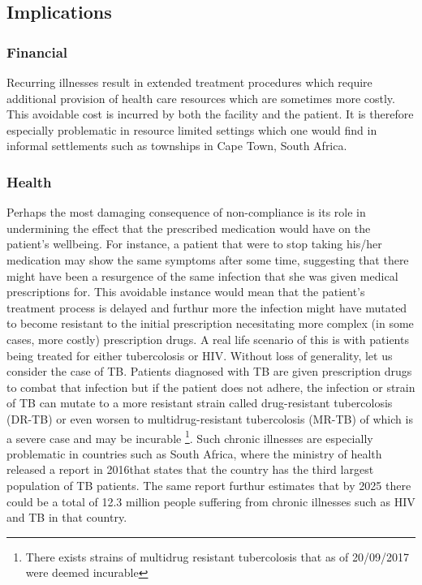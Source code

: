 \subsection{Implications}
\subsubsection{Financial}
Recurring illnesses result in extended treatment procedures which require additional provision of health care resources which are sometimes more costly\cite{SAGov16, Vern01}. This avoidable cost is incurred by both the facility and the patient. It is therefore especially problematic in resource limited settings which one would find in informal settlements such as townships in Cape Town, South Africa.

 \subsubsection{Health}

 Perhaps the most damaging consequence of non-compliance is its role in undermining the effect that the prescribed medication would have on the patient's wellbeing\cite{Vern01}. For instance, a patient that were to stop taking his/her medication may show the same symptoms after some time, suggesting that there might have been a resurgence of the same infection that she was given medical prescriptions for. This avoidable instance would mean that the patient's treatment process is delayed and furthur more the infection might have mutated  to become resistant to the initial prescription necesitating more complex (in some cases, more costly) prescription drugs. A real life scenario of this is with patients being treated for either tubercolosis or HIV. Without loss of generality, let us consider the case of TB. Patients diagnosed with TB are given prescription drugs to combat that infection but if the patient does not adhere, the infection or strain of TB can mutate to a more resistant strain called drug-resistant tubercolosis (DR-TB) or even worsen to multidrug-resistant tubercolosis (MR-TB) of which is a severe case and may be incurable \footnote{There exists strains of multidrug resistant tubercolosis that as of 20/09/2017 were deemed incurable}\cite{SAGov16}. Such chronic illnesses are especially problematic in countries such as South Africa, where the ministry of health released a report in 2016\cite{SAGov16}that states that the country has the third largest population of TB patients. The same report\cite{SAGov16} furthur estimates that by 2025 there could be a total of 12.3 million people suffering from chronic illnesses such as HIV and TB in that country.

